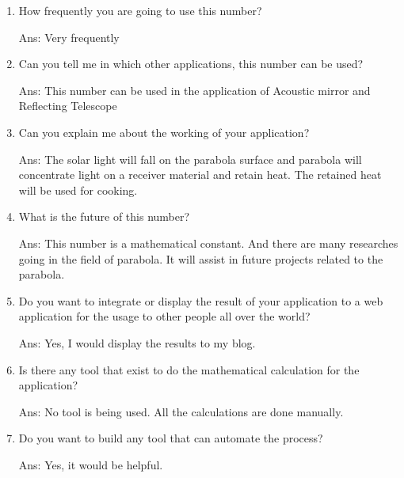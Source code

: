 \documentclass[12pt]{article}
\begin{document}
\begin{enumerate}
\item How frequently you are going to use this number?

Ans:  Very frequently

\item Can you tell me in which other applications, this number can be used?

Ans:  This number can be used in the application of Acoustic mirror and Reflecting Telescope


\item Can you explain me about the working of your application?

Ans:  The solar light will fall on the parabola surface and parabola will concentrate light on a            receiver material and retain heat. The retained heat will be used for cooking.

\item What is the future of this number?

Ans:  This number is a mathematical constant. And there are many researches going in the field  of parabola. It will assist in future projects related to the parabola.

\item Do you want to integrate or display the result of your application to a web application   for the usage to other people all over the world?

Ans:   Yes, I would display the results to my blog.

\item Is there any tool that exist to do the mathematical calculation for the application?

Ans:    No tool is being used. All the calculations are done manually.

\item Do you want to build any tool that can automate the process?

    Ans:     Yes, it would be helpful.

\end{enumerate}
\end{document}
